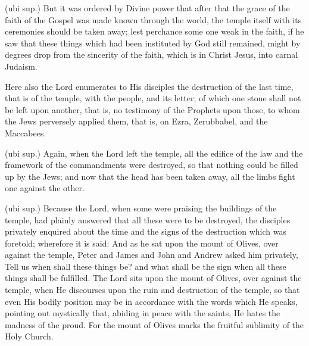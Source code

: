  (ubi sup.) But it was ordered by Divine power that after that the grace of the faith of the Gospel was made known through the world, the temple itself with its ceremonies should be taken away; lest perchance some one weak in the faith, if he saw that these things which had been instituted by God still remained, might by degrees drop from the sincerity of the faith, which is in Christ Jesus, into carnal Judaism.

 Here also the Lord enumerates to His disciples the destruction of the last time, that is of the temple, with the people, and its letter; of which one stone shall not be left upon another, that is, no testimony of the Prophets upon those, to whom the Jews perversely applied them, that is, on Ezra, Zerubbabel, and the Maccabees.

 (ubi sup.) Again, when the Lord left the temple, all the edifice of the law and the framework of the commandments were destroyed, so that nothing could be filled up by the Jews; and now that the head has been taken away, all the limbs fight one against the other.

 

 (ubi sup.) Because the Lord, when some were praising the buildings of the temple, had plainly answered that all these were to be destroyed, the disciples privately enquired about the time and the signs of the destruction which was foretold; wherefore it is said: And as he sat upon the mount of Olives, over against the temple, Peter and James and John and Andrew asked him privately, Tell us when shall these things be? and what shall be the sign when all these things shall be fulfilled. The Lord sits upon the mount of Olives, over against the temple, when He discourses upon the ruin and destruction of the temple, so that even His bodily position may be in accordance with the words which He speaks, pointing out mystically that, abiding in peace with the saints, He hates the madness of the proud. For the mount of Olives marks the fruitful sublimity of the Holy Church.

